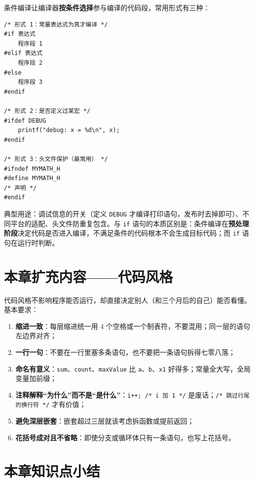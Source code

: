 条件编译让编译器\textbf{按条件选择}参与编译的代码段，常用形式有三种：

\begin{lstlisting}
/* 形式 1：常量表达式为真才编译 */
#if 表达式
    程序段 1
#elif 表达式
    程序段 2
#else
    程序段 3
#endif

/* 形式 2：是否定义过某宏 */
#ifdef DEBUG
    printf("debug: x = %d\n", x);
#endif

/* 形式 3：头文件保护（最常用） */
#ifndef MYMATH_H
#define MYMATH_H
/* 声明 */
#endif
\end{lstlisting}

典型用途：调试信息的开关（定义 \texttt{DEBUG} 才编译打印语句，发布时去掉即可）、不同平台的适配、头文件防重复包含。与 \texttt{if} 语句的本质区别是：条件编译在\textbf{预处理阶段}决定代码是否进入编译，不满足条件的代码根本不会生成目标代码；而 \texttt{if} 语句在运行时判断。

\section{本章扩充内容——代码风格}

代码风格不影响程序能否运行，却直接决定别人（和三个月后的自己）能否看懂。基本要求：

\begin{enumerate}
  \item \textbf{缩进一致}：每层缩进统一用 4 个空格或一个制表符，不要混用；同一层的语句左边界对齐；
  \item \textbf{一行一句}：不要在一行里塞多条语句，也不要把一条语句拆得七零八落；
  \item \textbf{命名有意义}：\texttt{sum}、\texttt{count}、\texttt{maxValue} 比 \texttt{a}、\texttt{b}、\texttt{x1} 好得多；常量全大写，全局变量加前缀；
  \item \textbf{注释解释“为什么”而不是“是什么”}：\texttt{i++;  /* i 加 1 */} 是废话；\texttt{/* 跳过行尾的换行符 */} 才有价值；
  \item \textbf{避免深层嵌套}：嵌套超过三层就该考虑拆函数或提前返回；
  \item \textbf{花括号成对且不省略}：即使分支或循环体只有一条语句，也写上花括号。
\end{enumerate}

\section{本章知识点小结}

